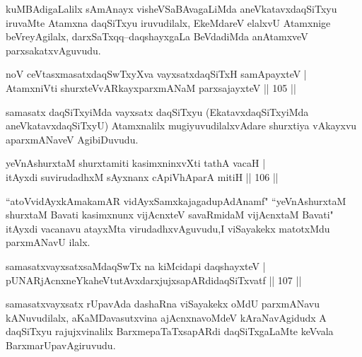 \begin{artha}
kuMBAdigaLalilx sAmAnayx visheVSaBAvagaLiMda aneVkatavxdaqSiTxyu iruvaMte Atamxna daqSiTxyu iruvudilalx, EkeMdareV elalxvU Atamxnige beVreyAgilalx, darxSaTxqq--daqshayxgaLa BeVdadiMda anAtamxveV parxsakatxvAguvudu.
\end{artha}


\begin{shl}
noV ceVtasxmasatxdaqSwTxyXva vayxsatxdaqSiTxH samApayxteV |\\
AtamxniVti shurxteVvARkayxparxmANaM parxsajayxteV \hfill || 105 ||
\end{shl}

\begin{artha}
samasatx daqSiTxyiMda vayxsatx daqSiTxyu (EkatavxdaqSiTxyiMda aneVkatavxdaqSiTxyU) Atamxnalilx mugiyuvudilalxvAdare shurxtiya vAkayxvu aparxmANaveV AgibiDuvudu.
\end{artha}

\begin{shl}
yeVnAshurxtaM shurxtamiti kasimxninxvXti tathA vacaH |\\
itAyxdi suvirudadhxM sAyxnanx cApiVhAparA mitiH \hfill || 106 ||
\end{shl}

\begin{artha}
``atoVvidAyxkAmakamAR vidAyxSamxkajagadupAdAnamf" ``yeVnAshurxtaM shurxtaM Bavati  kasimxnunx vijAcnxteV savaRmidaM vijAcnxtaM Bavati" itAyxdi vacanavu atayxMta virudadhxvAguvudu,I viSayakekx matotxMdu 
parxmANavU ilalx.
\end{artha}


\begin{shl}
samasatxvayxsatxsaMdaqSwTx na kiMcidapi daqshayxteV |\\
pUNARjAcnxneYkaheVtutAvxdarxjujxsapARdidaqSiTxvatf \hfill || 107 ||
\end{shl}

\begin{artha}
samasatxvayxsatx rUpavAda dashaRna viSayakekx oMdU parxmANavu kANuvudilalx, aKaMDavasutxvina ajAcnxnavoMdeV kAraNavAgidudx A daqSiTxyu rajujxvinalilx BarxmepaTaTxsapARdi daqSiTxgaLaMte keVvala BarxmarUpavAgiruvudu.
\end{artha}


